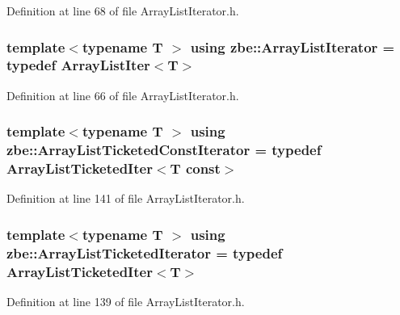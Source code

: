 Definition at line 68 of file Array\+List\+Iterator.\+h.

\hypertarget{namespacezbe_af0d8ed46769e5212c0baa5ae5190e604}{}
\subsubsection[{Array\+List\+Iterator}]{\setlength{\rightskip}{0pt plus 5cm}template$<$typename T $>$ using {\bf zbe\+::\+Array\+List\+Iterator} = typedef {\bf Array\+List\+Iter}$<$T$>$}\label{namespacezbe_af0d8ed46769e5212c0baa5ae5190e604}


Definition at line 66 of file Array\+List\+Iterator.\+h.

\hypertarget{namespacezbe_afa10c72425dcc83afff52e7f290a1aee}{}
\subsubsection[{Array\+List\+Ticketed\+Const\+Iterator}]{\setlength{\rightskip}{0pt plus 5cm}template$<$typename T $>$ using {\bf zbe\+::\+Array\+List\+Ticketed\+Const\+Iterator} = typedef {\bf Array\+List\+Ticketed\+Iter}$<$T const$>$}\label{namespacezbe_afa10c72425dcc83afff52e7f290a1aee}


Definition at line 141 of file Array\+List\+Iterator.\+h.

\hypertarget{namespacezbe_a1675a0090f0cdd995282757bb5f5bdbe}{}
\subsubsection[{Array\+List\+Ticketed\+Iterator}]{\setlength{\rightskip}{0pt plus 5cm}template$<$typename T $>$ using {\bf zbe\+::\+Array\+List\+Ticketed\+Iterator} = typedef {\bf Array\+List\+Ticketed\+Iter}$<$T$>$}\label{namespacezbe_a1675a0090f0cdd995282757bb5f5bdbe}


Definition at line 139 of file Array\+List\+Iterator.\+h.

\hypertarget{namespacezbe_a98051e0b03810ff1bbe41c451aa7568e}{}
